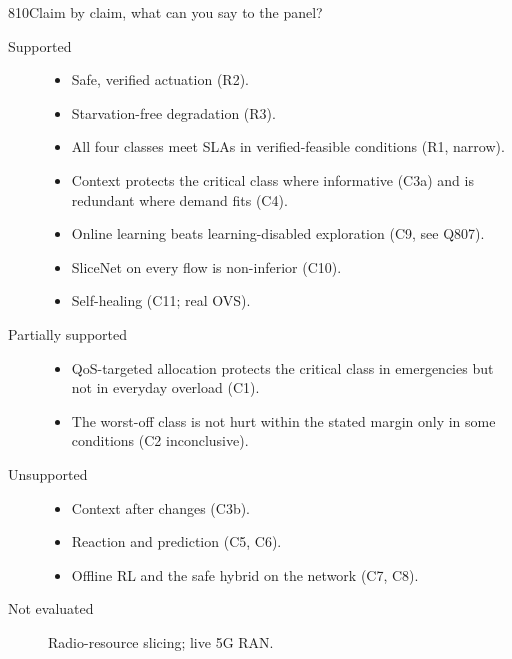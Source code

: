 \begin{qa}{810}{Claim by claim, what can you say to the panel?}
\begin{description}
\item[Supported]
  \begin{itemize}
  \item Safe, verified actuation (R2).
  \item Starvation-free degradation (R3).
  \item All four classes meet SLAs in verified-feasible conditions (R1, narrow).
  \item Context protects the critical class where informative (C3a) and is redundant where demand fits (C4).
  \item Online learning beats learning-disabled exploration (C9, see Q807).
  \item SliceNet on every flow is non-inferior (C10).
  \item Self-healing (C11; real OVS).
  \end{itemize}
\item[Partially supported]
  \begin{itemize}
  \item QoS-targeted allocation protects the critical class in emergencies but not in everyday overload (C1).
  \item The worst-off class is not hurt within the stated margin only in some conditions (C2 inconclusive).
  \end{itemize}
\item[Unsupported]
  \begin{itemize}
  \item Context after changes (C3b).
  \item Reaction and prediction (C5, C6).
  \item Offline RL and the safe hybrid on the network (C7, C8).
  \end{itemize}
\item[Not evaluated] Radio-resource slicing; live 5G RAN.
\end{description}
\end{qa}
